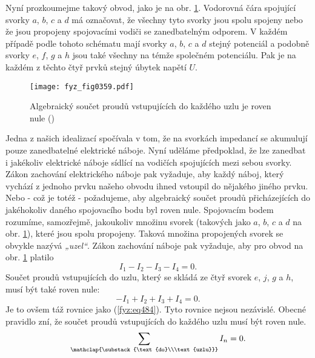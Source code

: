   Nyní prozkoumejme takový obvod, jako je na obr. \ref{fyz:fig0359}. Vodorovná čára spojující svorky 
  \(a\), \(b\), \(c\) a \(d\) má označovat, že všechny tyto svorky jsou spolu spojeny nebo že jsou 
  propojeny spojovacími vodiči se zanedbatelným odporem. V každém případě podle tohoto schématu 
  mají svorky \(a\), \(b\), \(c\) a \(d\) stejný potenciál a podobně svorky \(e\), \(f\), \(g\) a 
  \(h\) jsou také všechny na témže společném potenciálu. Pak je na každém z těchto čtyř prvků 
  stejný úbytek napětí \(U\).

  \begin{figure}[ht!] %
    \centering
    \texttt{[image: fyz\_fig0359.pdf]}
    \caption{Algebraický součet proudů vstupujících do každého uzlu je roven nule
             (\cite[s.~400]{Feynman02})}
    \label{fyz:fig0359}
  \end{figure}
  
  Jedna z našich idealizací spočívala v tom, že na svorkách impedancí se akumulují pouze 
  zanedbatelné elektrické náboje. Nyní uděláme předpoklad, že lze zanedbat i jakékoliv elektrické 
  náboje sídlící na vodičích spojujících mezi sebou svorky. Zákon zachování elektrického náboje pak 
  vyžaduje, aby každý náboj, který vychází z jednoho prvku našeho obvodu ihned vstoupil do nějakého 
  jiného prvku. Nebo - což je totéž - požadujeme, aby algebraický součet proudů přicházejících do 
  jakéhokoliv daného spojovacího bodu byl roven nule. Spojovacím bodem rozumíme, samozřejmě, 
  jakoukoliv množinu svorek (takových jako \(a\), \(b\), \(c\) a \(d\) na obr. \ref{fyz:fig0359}), 
  které jsou spolu propojeny. Taková množina propojených svorek se obvykle nazývá \emph{„uzel“}. 
  Zákon zachování náboje pak vyžaduje, aby pro obvod na obr. \ref{fyz:fig0359} platilo
  \begin{equation}\label{fyz:eq484}
    I_1 - I_2 - I_3 - I_4 = 0.
  \end{equation}
  Součet proudů vstupujících do uzlu, který se skládá ze čtyř svorek \(e\), \(j\), \(g\) a \(h\), 
  musí být také roven nule:
  \begin{equation}\label{fyz:eq485}
    - I_1 + I_2 + I_3 + I_4 = 0.
  \end{equation}
  Je to ovšem táž rovnice jako (\ref{fyz:eq484}). Tyto rovnice nejsou nezávislé. Obecné pravidlo 
  zní, že součet proudů vstupujících do každého uzlu musí být roven nule.
  \begin{equation}\label{fyz:eq486}
    \sum_{\mathclap{\substack{\text{do}\\\text{uzlu}}}} I_n = 0.
  \end{equation}
  
